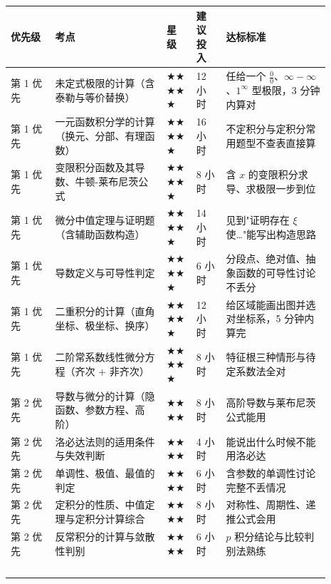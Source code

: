 \documentclass[11pt,openany,UTF8]{ctexbook}
\begin{document}
\begingroup\small\setlength{\tabcolsep}{4.0pt}
\begin{longtable}{@{}L{0.1272\linewidth}L{0.3052\linewidth}L{0.0862\linewidth}L{0.0890\linewidth}L{0.2865\linewidth}@{}}
\toprule
\textbf{优先级} & \textbf{考点} & \textbf{星级} & \textbf{建议投入} & \textbf{达标标准} \\
\midrule
\endhead
第 1 优先 & 未定式极限的计算（含泰勒与等价替换） & $\bigstar$$\bigstar$$\bigstar$$\bigstar$$\bigstar$ & 12 小时 & 任给一个 $\frac00$、$\infty-\infty$、$1^\infty$ 型极限，3 分钟内算对 \\
第 1 优先 & 一元函数积分学的计算（换元、分部、有理函数） & $\bigstar$$\bigstar$$\bigstar$$\bigstar$$\bigstar$ & 16 小时 & 不定积分与定积分常用题型不查表直接算 \\
第 1 优先 & 变限积分函数及其导数、牛顿-莱布尼茨公式 & $\bigstar$$\bigstar$$\bigstar$$\bigstar$$\bigstar$ & 8 小时 & 含 $x$ 的变限积分求导、求极限一步到位 \\
第 1 优先 & 微分中值定理与证明题（含辅助函数构造） & $\bigstar$$\bigstar$$\bigstar$$\bigstar$$\bigstar$ & 14 小时 & 见到"证明存在 $\xi$ 使…"能写出构造思路 \\
第 1 优先 & 导数定义与可导性判定 & $\bigstar$$\bigstar$$\bigstar$$\bigstar$$\bigstar$ & 6 小时 & 分段点、绝对值、抽象函数的可导性讨论不丢分 \\
第 1 优先 & 二重积分的计算（直角坐标、极坐标、换序） & $\bigstar$$\bigstar$$\bigstar$$\bigstar$$\bigstar$ & 12 小时 & 给区域能画出图并选对坐标系，5 分钟内算完 \\
第 1 优先 & 二阶常系数线性微分方程（齐次 + 非齐次） & $\bigstar$$\bigstar$$\bigstar$$\bigstar$$\bigstar$ & 8 小时 & 特征根三种情形与待定系数法全对 \\
第 2 优先 & 导数与微分的计算（隐函数、参数方程、高阶） & $\bigstar$$\bigstar$$\bigstar$$\bigstar$ & 8 小时 & 高阶导数与莱布尼茨公式能用 \\
第 2 优先 & 洛必达法则的适用条件与失效判断 & $\bigstar$$\bigstar$$\bigstar$$\bigstar$ & 4 小时 & 能说出什么时候不能用洛必达 \\
第 2 优先 & 单调性、极值、最值的判定 & $\bigstar$$\bigstar$$\bigstar$$\bigstar$ & 6 小时 & 含参数的单调性讨论完整不丢情况 \\
第 2 优先 & 定积分的性质、中值定理与定积分计算综合 & $\bigstar$$\bigstar$$\bigstar$$\bigstar$ & 8 小时 & 对称性、周期性、递推公式会用 \\
第 2 优先 & 反常积分的计算与敛散性判别 & $\bigstar$$\bigstar$$\bigstar$$\bigstar$ & 6 小时 & $p$ 积分结论与比较判别法熟练 \\
$$
\end{longtable}
\end{document}
